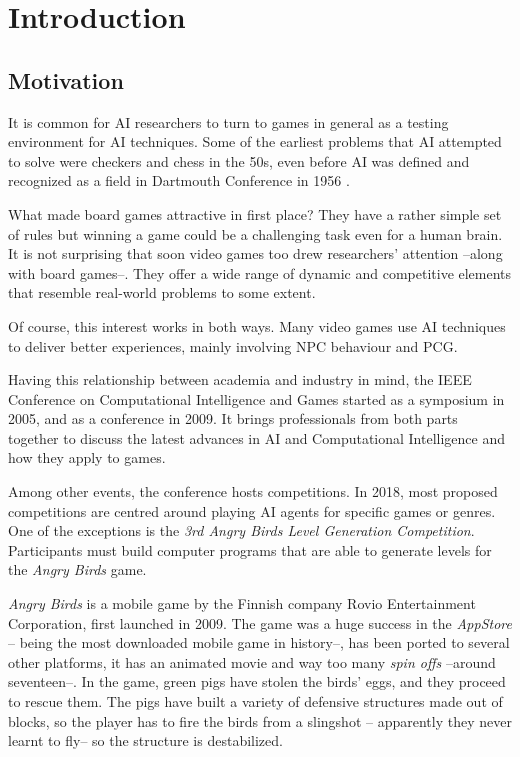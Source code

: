 \chapter{Introduction}\label{ch:introduction}
\section{Motivation}
It is common for AI researchers to turn to games in general as a testing environment for AI techniques. Some of the earliest problems that AI attempted to solve were checkers and chess in the 50s, even before AI was defined and recognized as a field in Dartmouth Conference in 1956 \cite{nilsson1998artificial}. 

What made board games attractive in first place? They have a rather simple set of rules but winning a game could be a challenging task even for a human brain. It is not surprising that soon video games too drew researchers' attention --along with board games--. They offer a wide range of dynamic and competitive elements that resemble real-world problems to some extent.

Of course, this interest works in both ways. Many video games use AI techniques to deliver better experiences, mainly involving \acf{NPC} behaviour and \acf{PCG}.

Having this relationship between academia and industry in mind, the IEEE Conference on Computational Intelligence and Games started as a symposium in 2005, and as a conference in 2009. It brings professionals from both parts together to discuss the latest advances in AI and Computational Intelligence and how they apply to games.\cite{ieee-cig}

Among other events, the conference hosts competitions. In 2018, most proposed competitions are centred around playing AI agents for specific games or genres. One of the exceptions is the \textit{3rd Angry Birds Level Generation Competition}. Participants must build computer programs that are able to generate levels for the\textit{ Angry Birds} game.

\textit{Angry Birds} is a mobile game by the Finnish company Rovio Entertainment Corporation\cite{angry-birds}, first launched in 2009. The game was a huge success in the \textit{AppStore} -- being the most downloaded mobile game in history--, has been ported to several other platforms, it has an animated movie and way too many \textit{spin offs} --around seventeen--. In the game, green pigs have stolen the birds' eggs, and they proceed to rescue them. The pigs have built a variety of defensive structures made out of blocks, so the player has to fire the birds from a slingshot -- apparently they never learnt to fly-- so the structure is destabilized.

